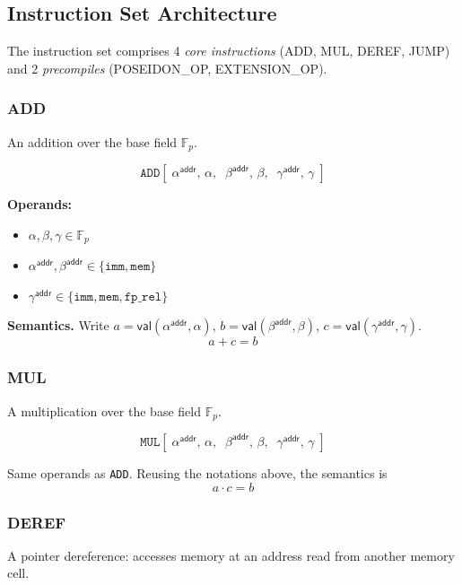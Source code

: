 \documentclass{article}
\theoremstyle{definition}
\newcommand{\Fp}{\mathbb F_p}
\begin{document}
\subsection{Instruction Set Architecture}\label{sec:isa}

The instruction set comprises 4 \emph{core instructions} (ADD, MUL, DEREF, JUMP) and 2 \emph{precompiles} (POSEIDON\_OP, EXTENSION\_OP).




\subsubsection{ADD}

An addition over the base field $\Fp$.

\[
\texttt{ADD}[\;\alpha^\textsf{addr},\, \alpha,\;\; \beta^\textsf{addr},\, \beta,\;\; \gamma^\textsf{addr},\, \gamma\;]
\]

\textbf{Operands:}
\begin{itemize}
    \item $\alpha, \beta, \gamma \in \Fp$
    \item $\alpha^\textsf{addr}, \beta^\textsf{addr} \in \{\texttt{imm}, \texttt{mem}\}$
    \item $\gamma^\textsf{addr} \in \{\texttt{imm}, \texttt{mem}, \texttt{fp\_rel}\}$
\end{itemize}

\textbf{Semantics.} Write $a = \mathsf{val}(\alpha^\textsf{addr}, \alpha)$, $b = \mathsf{val}(\beta^\textsf{addr}, \beta)$, $c = \mathsf{val}(\gamma^\textsf{addr}, \gamma)$.
\[
a + c = b
\]

\subsubsection{MUL}

A multiplication over the base field $\Fp$.

\[
\texttt{MUL}[\;\alpha^\textsf{addr},\, \alpha,\;\; \beta^\textsf{addr},\, \beta,\;\; \gamma^\textsf{addr},\, \gamma\;]
\]

Same operands as \texttt{ADD}. Reusing the notations above, the semantics is
\[
a \cdot c = b
\]



\subsubsection{DEREF}

A pointer dereference: accesses memory at an address read from another memory cell.
\end{document}
